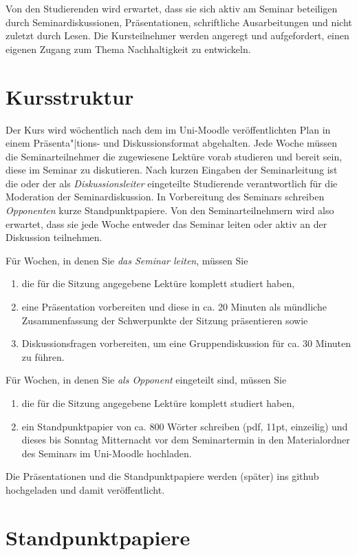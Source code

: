 \documentclass[11pt,a4paper]{article}
\begin{document}
Von den Studierenden wird erwartet, dass sie sich aktiv am Seminar beteiligen
durch Seminardiskussionen, Präsentationen, schriftliche Ausarbeitungen und
nicht zuletzt durch Lesen. Die Kursteilnehmer werden angeregt und
aufgefordert, einen eigenen Zugang zum Thema Nachhaltigkeit zu entwickeln.

\section{Kursstruktur}

Der Kurs wird wöchentlich nach dem im Uni-Moodle veröffentlichten Plan in
einem Präsenta"|tions- und Diskussionsformat abgehalten.  Jede Woche müssen
die Seminarteilnehmer die zugewiesene Lektüre vorab studieren und bereit sein,
diese im Seminar zu diskutieren. Nach kurzen Eingaben der Seminarleitung ist
die oder der als \emph{Diskussionsleiter} eingeteilte Studierende
verantwortlich für die Moderation der Seminardiskussion. In Vorbereitung des
Seminars schreiben \emph{Opponenten} kurze Standpunktpapiere.  Von den
Seminarteilnehmern wird also erwartet, dass sie jede Woche entweder das
Seminar leiten oder aktiv an der Diskussion teilnehmen.

Für Wochen, in denen Sie \emph{das Seminar leiten}, müssen Sie
\begin{enumerate}
\item die für die Sitzung angegebene Lektüre komplett studiert haben,
\item eine Präsentation vorbereiten und diese in ca. 20 Minuten als mündliche
  Zusammenfassung der Schwerpunkte der Sitzung präsentieren sowie
\item Diskussionsfragen vorbereiten, um eine Gruppendiskussion für ca. 30
  Minuten zu führen.
\end{enumerate}
Für Wochen, in denen Sie \emph{als Opponent} eingeteilt sind, müssen Sie
\begin{enumerate}
\item die für die Sitzung angegebene Lektüre komplett studiert haben, 
\item ein Standpunktpapier von ca. 800 Wörter schreiben (pdf, 11pt, einzeilig)
  und dieses bis Sonntag Mitternacht vor dem Seminartermin in den
  Materialordner des Seminars im Uni-Moodle hochladen.
\end{enumerate}

Die Präsentationen und die Standpunktpapiere werden (später) ins github
hochgeladen und damit veröffentlicht.


\section{Standpunktpapiere}
\end{document}
